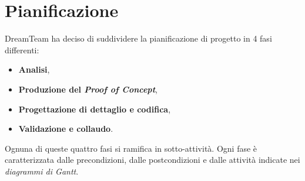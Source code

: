 \section{Pianificazione}
DreamTeam ha deciso di suddividere la pianificazione di progetto in 4 fasi differenti:

\begin{itemize}
\item \textbf{Analisi},
\item \textbf{Produzione del \textit{Proof of Concept}\glo{}},
\item \textbf{Progettazione di dettaglio e codifica},
\item \textbf{Validazione e collaudo}.
\end{itemize}
Ognuna di queste quattro fasi si ramifica in sotto-attività. Ogni fase è caratterizzata dalle precondizioni, dalle postcondizioni e dalle attività indicate nei \textit{diagrammi di Gantt}\glo{}.


\pagebreak

\pagebreak

\pagebreak





